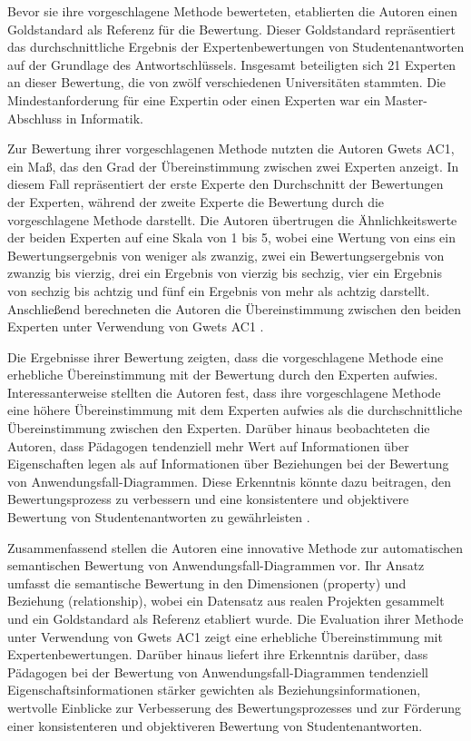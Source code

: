 Bevor sie ihre vorgeschlagene Methode bewerteten, etablierten die Autoren einen Goldstandard als Referenz für die Bewertung. Dieser Goldstandard repräsentiert das durchschnittliche Ergebnis der Expertenbewertungen von Studentenantworten auf der Grundlage des Antwortschlüssels. Insgesamt beteiligten sich 21 Experten an dieser Bewertung, die von zwölf verschiedenen Universitäten stammten. Die Mindestanforderung für eine Expertin oder einen Experten war ein Master-Abschluss in Informatik.

Zur Bewertung ihrer vorgeschlagenen Methode nutzten die Autoren Gwets AC1, ein Maß, das den Grad der Übereinstimmung zwischen zwei Experten anzeigt. In diesem Fall repräsentiert der erste Experte den Durchschnitt der Bewertungen der Experten, während der zweite Experte die Bewertung durch die vorgeschlagene Methode darstellt. Die Autoren übertrugen die Ähnlichkeitswerte der beiden Experten auf eine Skala von 1 bis 5, wobei eine Wertung von eins ein Bewertungsergebnis von weniger als zwanzig, zwei ein Bewertungsergebnis von zwanzig bis vierzig, drei ein Ergebnis von vierzig bis sechzig, vier ein Ergebnis von sechzig bis achtzig und fünf ein Ergebnis von mehr als achtzig darstellt. Anschließend berechneten die Autoren die Übereinstimmung zwischen den beiden Experten unter Verwendung von Gwets AC1 \cite{fauzan2021different}.

Die Ergebnisse ihrer Bewertung zeigten, dass die vorgeschlagene Methode eine erhebliche Übereinstimmung mit der Bewertung durch den Experten aufwies. Interessanterweise stellten die Autoren fest, dass ihre vorgeschlagene Methode eine höhere Übereinstimmung mit dem Experten aufwies als die durchschnittliche Übereinstimmung zwischen den Experten. Darüber hinaus beobachteten die Autoren, dass Pädagogen tendenziell mehr Wert auf Informationen über Eigenschaften legen als auf Informationen über Beziehungen bei der Bewertung von Anwendungsfall-Diagrammen. Diese Erkenntnis könnte dazu beitragen, den Bewertungsprozess zu verbessern und eine konsistentere und objektivere Bewertung von Studentenantworten zu gewährleisten \cite{fauzan2021different}.

Zusammenfassend stellen die Autoren eine innovative Methode zur automatischen semantischen Bewertung von Anwendungsfall-Diagrammen vor. Ihr Ansatz umfasst die semantische Bewertung in den Dimensionen (property) und Beziehung (relationship), wobei ein Datensatz aus realen Projekten gesammelt und ein Goldstandard als Referenz etabliert wurde. Die Evaluation ihrer Methode unter Verwendung von Gwets AC1 zeigt eine erhebliche Übereinstimmung mit Expertenbewertungen. Darüber hinaus liefert ihre Erkenntnis darüber, dass Pädagogen bei der Bewertung von Anwendungsfall-Diagrammen tendenziell Eigenschaftsinformationen stärker gewichten als Beziehungsinformationen, wertvolle Einblicke zur Verbesserung des Bewertungsprozesses und zur Förderung einer konsistenteren und objektiveren Bewertung von Studentenantworten.

